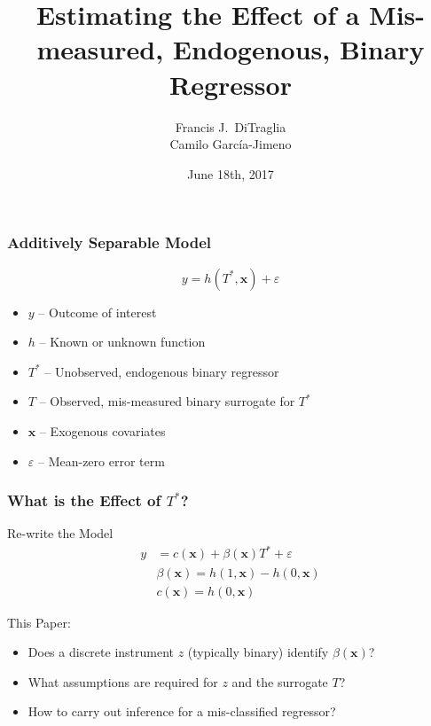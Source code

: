 \documentclass{beamer}
\title[Binary Regressors]{Estimating the Effect of a Mis-measured, Endogenous, Binary Regressor}
\author[FJ DiTraglia]{Francis J.\ DiTraglia\\ Camilo Garc\'{i}a-Jimeno}
\institute{University of Pennsylvania}
\date{June 18th, 2017}
\begin{document}
 

\begin{frame}[plain]
	\titlepage 
\end{frame} 
\begin{frame}
  \frametitle{Additively Separable Model}
\[
  y = h(T^*, \mathbf{x}) + \varepsilon
\]
\vspace{-1em}
    \begin{itemize}    
    \item $y$ -- Outcome of interest
    \item $h$ -- Known or unknown function 
    \item $T^*$ -- Unobserved, endogenous binary regressor
    \item $T$ -- Observed, mis-measured binary surrogate for $T^*$
    \item $\mathbf{x}$ -- Exogenous covariates
    \item $\varepsilon$ -- Mean-zero error term
  \end{itemize}

\end{frame}
\begin{frame}
  \frametitle{What is the Effect of $T^*$?}
 
  \begin{block}{Re-write the Model}
\begin{align*}
  y &= c(\mathbf{x}) + \beta(\mathbf{x}) T^* + \varepsilon\\
  &\beta(\mathbf{x}) = h(1,\mathbf{x}) - h(0,\mathbf{x})\\
  &c(\mathbf{x}) = h(0,\mathbf{x})
\end{align*}
  \end{block}

  \begin{alertblock}{This Paper:}
    \begin{itemize}
      \item Does a discrete instrument $z$ (typically binary) identify $\beta(\mathbf{x})$? 
      \item What assumptions are required for $z$ and the surrogate $T$?
      \item How to carry out inference for a mis-classified regressor?
    \end{itemize}
  \end{alertblock}
\end{frame}
\end{document}
